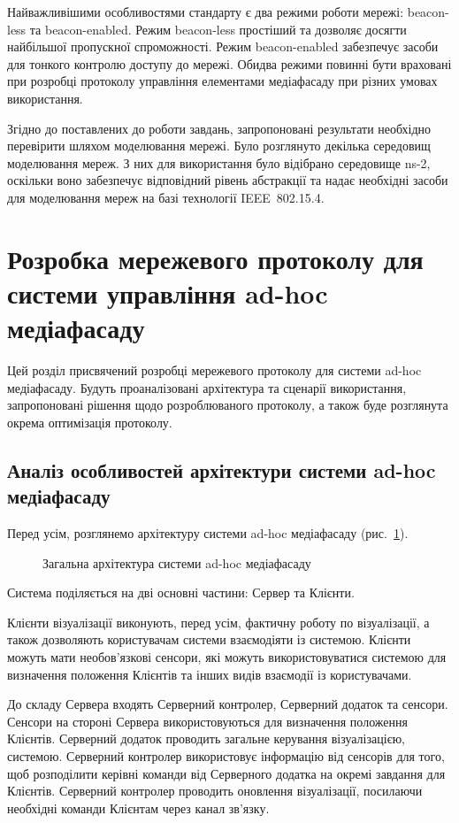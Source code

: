\documentclass[a4paper,ukrainian,utf8,nocolumnsxix,floatsection,equationsection]{eskdtext}
\newcommand{\figref}[1]{рис.~\ref{#1}}
\newcommand{\iee}[0]{IEEE~802.15.4\xspace}
\newcommand{\blm}[0]{beacon-less\xspace}
\newcommand{\bem}[0]{beacon-enabled\xspace}
\begin{document}
Найважливішими особливостями стандарту є два режими роботи мережі: \blm та \bem. Режим \blm простіший та дозволяє досягти найбільшої пропускної спроможності. Режим \bem забезпечує засоби для тонкого контролю доступу до мережі. Обидва режими повинні бути враховані при розробці протоколу управління елементами медіафасаду при різних умовах використання.

Згідно до поставлених до роботи завдань, запропоновані результати необхідно перевірити шляхом моделювання мережі. Було розглянуто декілька середовищ моделювання мереж. З них для використання було відібрано середовище ns-2, оскільки воно забезпечує відповідний рівень абстракції та надає необхідні засоби для моделювання мереж на базі технології \iee.


\section{Розробка мережевого протоколу для системи управління ad-hoc медіафасаду}
\label{sec:2:network:protocol:amf}


Цей розділ присвячений розробці мережевого протоколу для системи ad-hoc медіафасаду. Будуть проаналізовані архітектура та сценарії використання, запропоновані рішення щодо розроблюваного протоколу, а також буде розглянута окрема оптимізація протоколу.

\subsection{Аналіз особливостей архітектури системи ad-hoc медіафасаду}
\label{sub:system:arch}

Перед усім, розглянемо архітектуру системи ad-hoc медіафасаду (\figref{fig:sys_arch}). 

\begin{figure}[bth]
\centering
{}
\caption{\label{fig:sys_arch}Загальна архітектура системи ad-hoc медіафасаду}
\end{figure}

Система поділяється на дві основні частини: Сервер та Клієнти.

Клієнти візуалізації виконують, перед усім, фактичну роботу по візуалізації, а також дозволяють користувачам системи взаємодіяти із системою. Клієнти можуть мати необов'язкові сенсори, які можуть використовуватися системою для визначення положення Клієнтів та інших видів взаємодії із користувачами.

До складу Сервера входять Серверний контролер, Серверний додаток та сенсори. Сенсори на стороні Сервера використовуються для визначення положення Клієнтів. Серверний додаток проводить загальне керування візуалізацією, системою. Серверний контролер використовує інформацію від сенсорів для того, щоб розподілити керівні команди від Серверного додатка на окремі завдання для Клієнтів. Серверний контролер проводить оновлення візуалізації, посилаючи необхідні команди Клієнтам через канал зв'язку.
\end{document}
